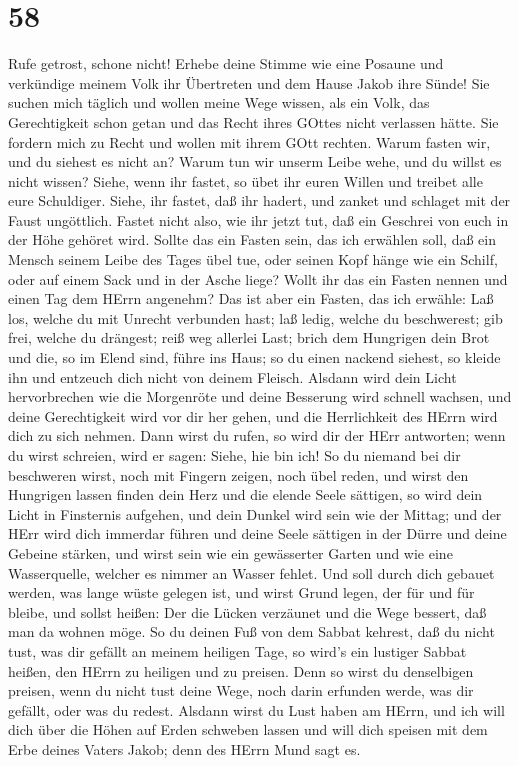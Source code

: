 \hypertarget{section-57}{%
\section{58}\label{section-57}}

 Rufe getrost, schone nicht! Erhebe deine Stimme wie eine
Posaune und verkündige meinem Volk ihr Übertreten und dem Hause Jakob
ihre Sünde!  Sie suchen mich täglich und wollen meine Wege
wissen, als ein Volk, das Gerechtigkeit schon getan und das Recht ihres
GOttes nicht verlassen hätte. Sie fordern mich zu Recht und wollen mit
ihrem GOtt rechten.  Warum fasten wir, und du siehest es
nicht an? Warum tun wir unserm Leibe wehe, und du willst es nicht
wissen? Siehe, wenn ihr fastet, so übet ihr euren Willen und treibet
alle eure Schuldiger.  Siehe, ihr fastet, daß ihr hadert,
und zanket und schlaget mit der Faust ungöttlich. Fastet nicht also, wie
ihr jetzt tut, daß ein Geschrei von euch in der Höhe gehöret wird.
 Sollte das ein Fasten sein, das ich erwählen soll, daß ein
Mensch seinem Leibe des Tages übel tue, oder seinen Kopf hänge wie ein
Schilf, oder auf einem Sack und in der Asche liege? Wollt ihr das ein
Fasten nennen und einen Tag dem HErrn angenehm?  Das ist
aber ein Fasten, das ich erwähle: Laß los, welche du mit Unrecht
verbunden hast; laß ledig, welche du beschwerest; gib frei, welche du
drängest; reiß weg allerlei Last;  brich dem Hungrigen dein
Brot und die, so im Elend sind, führe ins Haus; so du einen nackend
siehest, so kleide ihn und entzeuch dich nicht von deinem Fleisch.
 Alsdann wird dein Licht hervorbrechen wie die Morgenröte
und deine Besserung wird schnell wachsen, und deine Gerechtigkeit wird
vor dir her gehen, und die Herrlichkeit des HErrn wird dich zu sich
nehmen.  Dann wirst du rufen, so wird dir der HErr
antworten; wenn du wirst schreien, wird er sagen: Siehe, hie bin ich! So
du niemand bei dir beschweren wirst, noch mit Fingern zeigen, noch übel
reden,  und wirst den Hungrigen lassen finden dein Herz und
die elende Seele sättigen, so wird dein Licht in Finsternis aufgehen,
und dein Dunkel wird sein wie der Mittag;  und der HErr
wird dich immerdar führen und deine Seele sättigen in der Dürre und
deine Gebeine stärken, und wirst sein wie ein gewässerter Garten und wie
eine Wasserquelle, welcher es nimmer an Wasser fehlet.  Und
soll durch dich gebauet werden, was lange wüste gelegen ist, und wirst
Grund legen, der für und für bleibe, und sollst heißen: Der die Lücken
verzäunet und die Wege bessert, daß man da wohnen möge.  So
du deinen Fuß von dem Sabbat kehrest, daß du nicht tust, was dir gefällt
an meinem heiligen Tage, so wird's ein lustiger Sabbat heißen, den HErrn
zu heiligen und zu preisen. Denn so wirst du denselbigen preisen, wenn
du nicht tust deine Wege, noch darin erfunden werde, was dir gefällt,
oder was du redest.  Alsdann wirst du Lust haben am HErrn,
und ich will dich über die Höhen auf Erden schweben lassen und will dich
speisen mit dem Erbe deines Vaters Jakob; denn des HErrn Mund sagt es.

